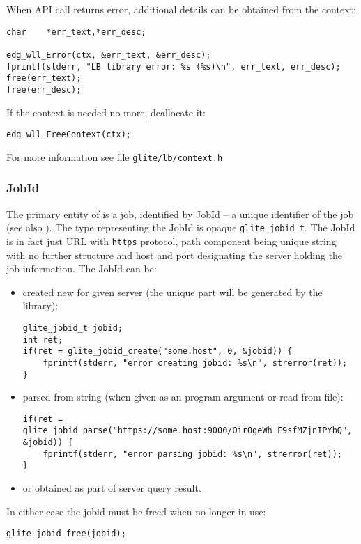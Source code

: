 
%
When \LB API call returns error, additional details can be obtained
from the context:
\begin{lstlisting}
char    *err_text,*err_desc;

edg_wll_Error(ctx, &err_text, &err_desc);
fprintf(stderr, "LB library error: %s (%s)\n", err_text, err_desc);
free(err_text);
free(err_desc);
\end{lstlisting}

%
If the context is needed no more, deallocate it:
\begin{lstlisting}
edg_wll_FreeContext(ctx);
\end{lstlisting}

For more information see file \verb'glite/lb/context.h'

\subsubsection{JobId}
The primary entity of \LB is a job, identified by JobId -- a unique
identifier of the job (see also \cite{lbug}). The type representing
the JobId is opaque \verb'glite_jobid_t'. The JobId is in fact
just URL with \verb'https' protocol, path component being unique string
with no further structure and host and port designating the \LB server
holding the job information. The JobId can be:
\begin{itemize}
\item created new for given \LB server (the unique part will be
generated by the \LB library):
\begin{lstlisting}
glite_jobid_t jobid;
int ret;
if(ret = glite_jobid_create("some.host", 0, &jobid)) {
	fprintf(stderr, "error creating jobid: %s\n", strerror(ret));
}
\end{lstlisting}
\item parsed from string (\eg when given as an program argument or
read from file):
\begin{lstlisting}[firstnumber=3]
if(ret = glite_jobid_parse("https://some.host:9000/OirOgeWh_F9sfMZjnIPYhQ", &jobid)) {
	fprintf(stderr, "error parsing jobid: %s\n", strerror(ret));
}
\end{lstlisting}
\item or obtained as part of \LB server query result.
\end{itemize}
In either case the jobid must be freed when no longer in use:
\begin{lstlisting}
glite_jobid_free(jobid);
\end{lstlisting}

